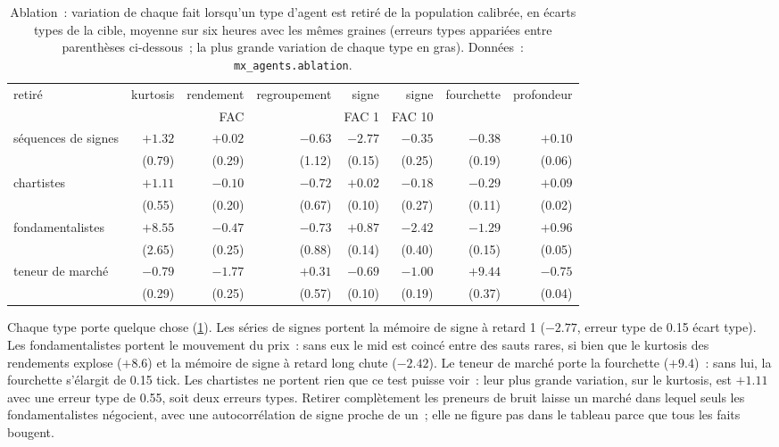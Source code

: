 \begin{table}[ht]
\centering
\small
\begin{tabular}{@{}lrrrrrrr@{}}
\toprule
retiré & kurtosis & rendement & regroupement & signe & signe & fourchette & profondeur \\
 & & FAC & & FAC 1 & FAC 10 & & \\
\midrule
séquences de signes & $+1.32$ & $+0.02$ & $-0.63$ & $\mathbf{-2.77}$ & $-0.35$ & $-0.38$ & $+0.10$ \\
 & (0.79) & (0.29) & (1.12) & (0.15) & (0.25) & (0.19) & (0.06) \\[2pt]
chartistes & $\mathbf{+1.11}$ & $-0.10$ & $-0.72$ & $+0.02$ & $-0.18$ & $-0.29$ & $+0.09$ \\
 & (0.55) & (0.20) & (0.67) & (0.10) & (0.27) & (0.11) & (0.02) \\[2pt]
fondamentalistes & $\mathbf{+8.55}$ & $-0.47$ & $-0.73$ & $+0.87$ & $-2.42$ & $-1.29$ & $+0.96$ \\
 & (2.65) & (0.25) & (0.88) & (0.14) & (0.40) & (0.15) & (0.05) \\[2pt]
teneur de marché & $-0.79$ & $-1.77$ & $+0.31$ & $-0.69$ & $-1.00$ & $\mathbf{+9.44}$ & $-0.75$ \\
 & (0.29) & (0.25) & (0.57) & (0.10) & (0.19) & (0.37) & (0.04) \\[2pt]
\bottomrule
\end{tabular}
\caption{Ablation~: variation de chaque fait lorsqu'un type d'agent est retiré de la population calibrée, en écarts types de la cible, moyenne sur
six heures avec les mêmes graines (erreurs types appariées entre parenthèses ci-dessous~; la plus grande variation de chaque type en gras). Données~:
\texttt{mx\_agents.ablation}.}\label{tab:mx:build-an-agent-based-market:abl}
\end{table}

Chaque type porte quelque chose (\cref{tab:mx:build-an-agent-based-market:abl}). Les séries de signes portent la mémoire de signe à retard 1 ($-2.77$, erreur type de 0.15 écart type).
Les fondamentalistes portent le mouvement du prix~: sans eux le mid est coincé entre des sauts rares, si bien que le kurtosis des rendements explose ($+8.6$) et la
mémoire de signe à retard long chute ($-2.42$). Le teneur de marché porte la fourchette ($+9.4$)~: sans lui, la fourchette s'élargit de 0.15 tick. Les chartistes
ne portent rien que ce test puisse voir~: leur plus grande variation, sur le kurtosis, est $+1.11$ avec une erreur type de 0.55, soit deux erreurs types. Retirer complètement les preneurs de bruit laisse un marché dans
lequel seuls les fondamentalistes négocient, avec une autocorrélation de signe proche de un~; elle ne figure pas dans le tableau parce que tous les faits bougent.

